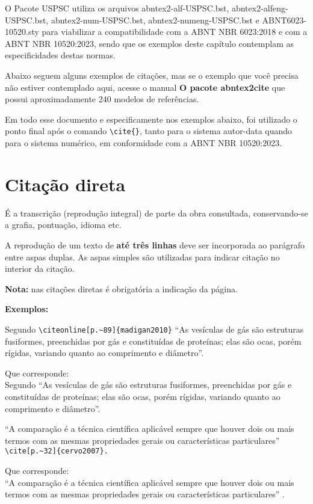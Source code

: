O Pacote USPSC utiliza os arquivos abntex2-alf-USPSC.bst, abntex2-alfeng-USPSC.bst, abntex2-num-USPSC.bst, abntex2-numeng-USPSC.bst e ABNT6023-10520.sty para viabilizar a compatibilidade com a ABNT NBR 6023:2018 e com a ABNT NBR 10520:2023, sendo que os exemplos deste capítulo contemplam as especificidades destas normas.

Abaixo seguem alguns exemplos de citações, mas se o exemplo que você precisa não estiver contemplado aqui, acesse o manual \textbf{O pacote abntex2cite} que possui aproximadamente 240 modelos de referências.

Em todo esse documento e especificamente nos exemplos abaixo, foi utilizado o ponto final após o comando \verb+\cite{}+, tanto para o sistema autor-data quando para o sistema numérico, em conformidade com a ABNT NBR 10520:2023. 

\section{Citação direta}

É a transcrição (reprodução integral) de parte da obra consultada, conservando-se a grafia, pontuação, idioma etc.

A reprodução de um texto de \textbf{até três linhas} deve ser incorporada ao parágrafo entre aspas duplas. As aspas simples são utilizadas para indicar citação no interior da citação.

\textbf{Nota:} nas citações diretas é obrigatória a indicação da página.

\textbf{Exemplos: }

\begin{alineas} 
\item 

Segundo \verb+\citeonline[p.~89]{madigan2010}+ “As vesículas de gás são estruturas fusiformes, preenchidas por gás e constituídas de proteínas; elas são ocas, porém rígidas, variando quanto ao comprimento e diâmetro”.

Que corresponde: \\
Segundo  “As vesículas de gás são estruturas
fusiformes, preenchidas por gás e constituídas de proteínas; elas são ocas, porém
rígidas, variando quanto ao comprimento e diâmetro”.

\item 

“A comparação é a técnica científica aplicável sempre que houver dois ou
mais termos com as mesmas propriedades gerais ou características particulares”  \verb+\cite[p.~32]{cervo2007}.+

Que corresponde: \\
“A comparação é a técnica científica aplicável sempre que houver dois ou
mais termos com as mesmas propriedades gerais ou características particulares” \cite[p.~32]{cervo2007}.

\end{alineas}

